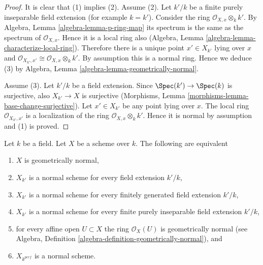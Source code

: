 \begin{proof}
It is clear that (1) implies (2). Assume (2). Let $k'/k$ be a finite
purely inseparable field extension (for example $k = k'$). Consider the ring
$\mathcal{O}_{X, x} \otimes_k k'$.
By Algebra, Lemma \ref{algebra-lemma-p-ring-map}
its spectrum is the same as the spectrum of $\mathcal{O}_{X, x}$.
Hence it is a local ring also
(Algebra, Lemma \ref{algebra-lemma-characterize-local-ring}).
Therefore there is a unique point $x' \in X_{k'}$ lying over $x$
and $\mathcal{O}_{X_{k'}, x'} \cong \mathcal{O}_{X, x} \otimes_k k'$.
By assumption this is a normal ring. Hence we deduce (3) by
Algebra, Lemma
\ref{algebra-lemma-geometrically-normal}.

\medskip\noindent
Assume (3). Let $k'/k$ be a field extension. Since
$\Spec(k') \to \Spec(k)$ is surjective, also
$X_{k'} \to X$ is surjective
(Morphisms, Lemma \ref{morphisms-lemma-base-change-surjective}).
Let $x' \in X_{k'}$ be any point lying over $x$.
The local ring $\mathcal{O}_{X_{k'}, x'}$
is a localization of the ring $\mathcal{O}_{X, x} \otimes_k k'$.
Hence it is normal by assumption and (1) is proved.
\end{proof}

\begin{lemma}
\label{lemma-geometrically-normal}
Let $k$ be a field.
Let $X$ be a scheme over $k$.
The following are equivalent
\begin{enumerate}
\item $X$ is geometrically normal,
\item $X_{k'}$ is a normal scheme for every field extension $k'/k$,
\item $X_{k'}$ is a normal scheme for every finitely generated field
extension $k'/k$,
\item $X_{k'}$ is a normal scheme for every finite purely inseparable
field extension $k'/k$,
\item for every affine open $U \subset X$ the ring $\mathcal{O}_X(U)$
is geometrically normal (see
Algebra, Definition \ref{algebra-definition-geometrically-normal}), and
\item $X_{k^{perf}}$ is a normal scheme.
\end{enumerate}
\end{lemma}


